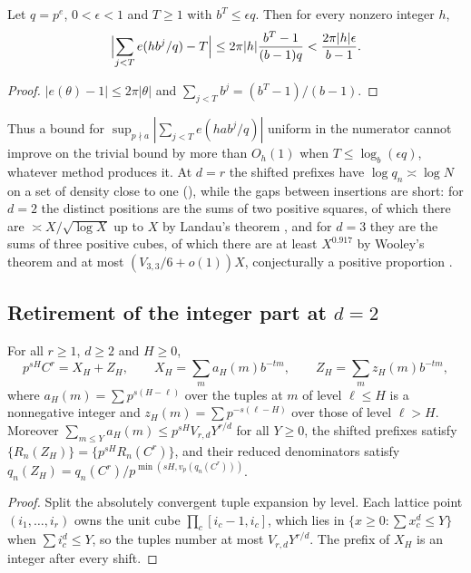 \documentclass[11pt]{article}
\newcommand{\fr}[1]{\{#1\}}
\begin{document}
\begin{lemma}\label{lem:nocancel}
Let $q=p^e$, $0<\epsilon<1$ and $T\ge1$ with $b^T\le\epsilon q$. Then for every nonzero integer $h$,
\[
\Bigl|\sum_{j<T}e(hb^j/q)-T\Bigr|\le2\pi|h|\frac{b^T-1}{(b-1)q}<\frac{2\pi|h|\epsilon}{b-1}.
\]
\end{lemma}

\begin{proof}
$|e(\theta)-1|\le2\pi|\theta|$ and $\sum_{j<T}b^j=(b^T-1)/(b-1)$.
\end{proof}

Thus a bound for $\sup_{p\nmid a}|\sum_{j<T}e(hab^j/q)|$ uniform in the numerator cannot improve on the
trivial bound by more than $O_h(1)$ when $T\le\log_b(\epsilon q)$, whatever method produces it. At $d=r$ the
shifted prefixes have $\log q_n\asymp\log N$ on a set of density close to one (), while
the gaps between insertions are short: for $d=2$ the distinct positions are the sums of two positive
squares, of which there are $\asymp X/\sqrt{\log X}$ up to $X$ by Landau's theorem \cite{Landau08}, and for
$d=3$ they are the sums of three positive cubes, of which there are at least $X^{0.917}$ by Wooley's theorem
\cite{Wooley15} and at most $(V_{3,3}/6+o(1))X$, conjecturally a positive proportion \cite{DHL06}.

\subsection{Retirement of the integer part at \texorpdfstring{$d=2$}{d = 2}}

\begin{proposition}\label{prop:filtration}
For all $r\ge1$, $d\ge2$ and $H\ge0$,
\[
p^{sH}C^r=X_H+Z_H,\qquad X_H=\sum_ma_H(m)b^{-tm},\qquad Z_H=\sum_mz_H(m)b^{-tm},
\]
where $a_H(m)=\sum p^{s(H-\ell)}$ over the tuples at $m$ of level $\ell\le H$ is a nonnegative integer and
$z_H(m)=\sum p^{-s(\ell-H)}$ over those of level $\ell>H$. Moreover $\sum_{m\le Y}a_H(m)\le p^{sH}V_{r,d}Y^{r/d}$
for all $Y\ge0$, the shifted prefixes satisfy $\fr{R_n(Z_H)}=\fr{p^{sH}R_n(C^r)}$, and their reduced
denominators satisfy $q_n(Z_H)=q_n(C^r)/p^{\min(sH,v_p(q_n(C^r)))}$.
\end{proposition}

\begin{proof}
Split the absolutely convergent tuple expansion by level. Each lattice point $(i_1,\ldots,i_r)$ owns the unit
cube $\prod_c[i_c-1,i_c]$, which lies in $\{x\ge0:\sum x_c^d\le Y\}$ when $\sum i_c^d\le Y$, so the tuples number at
most $V_{r,d}Y^{r/d}$. The prefix of $X_H$ is an integer after every shift.
\end{proof}
\end{document}
